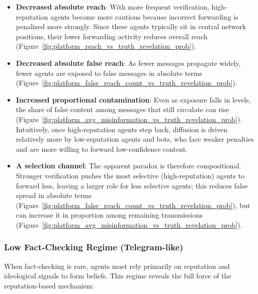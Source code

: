 \begin{itemize}
    \item \textbf{Decreased absolute reach}: With more frequent verification, high-reputation agents become more cautious because incorrect forwarding is penalized more strongly. Since these agents typically sit in central network positions, their lower forwarding activity reduces overall reach (Figure~\ref{fig:platform_reach_vs_truth_revelation_prob}).
    
    \item \textbf{Decreased absolute false reach}: As fewer messages propagate widely, fewer agents are exposed to false messages in absolute terms (Figure~\ref{fig:platform_false_reach_count_vs_truth_revelation_prob}).
    
    \item \textbf{Increased proportional contamination}: Even as exposure falls in levels, the share of false content among messages that still circulate can rise (Figure~\ref{fig:platform_avg_misinformation_vs_truth_revelation_prob}). Intuitively, once high-reputation agents step back, diffusion is driven relatively more by low-reputation agents and bots, who face weaker penalties and are more willing to forward low-confidence content.
    
    \item \textbf{A selection channel}: The apparent paradox is therefore compositional. Stronger verification pushes the most selective (high-reputation) agents to forward less, leaving a larger role for less selective agents; this reduces false spread in absolute terms (Figure~\ref{fig:platform_false_reach_count_vs_truth_revelation_prob}), but can increase it in proportion among remaining transmissions (Figure~\ref{fig:platform_avg_misinformation_vs_truth_revelation_prob}).
\end{itemize}

\subsubsection{Low Fact-Checking Regime (Telegram-like)}

When fact-checking is rare, agents must rely primarily on reputation and ideological signals to form beliefs. This regime reveals the full force of the reputation-based mechanism:

